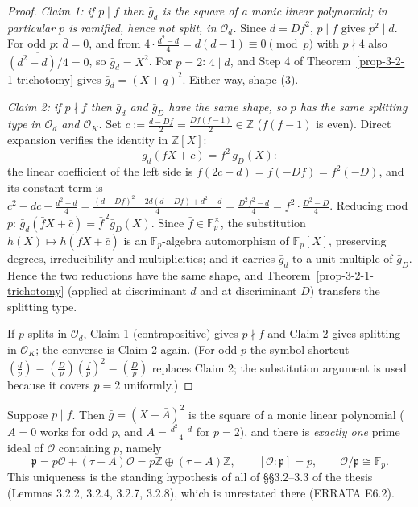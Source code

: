 \begin{proof}
  \emph{Claim 1: if $p \mid f$ then $\bar g_d$ is the square of a monic
  linear polynomial; in particular $p$ is ramified, hence not split, in
  $\mathcal{O}_d$.} Since $d = Df^2$, $p \mid f$ gives $p^2 \mid d$. For odd
  $p$: $\bar d = 0$, and from $4 \cdot \tfrac{d^2-d}{4} = d(d-1) \equiv 0
  \pmod p$ with $p \nmid 4$ also $\overline{(d^2 - d)/4} = 0$, so
  $\bar g_d = X^2$. For $p = 2$: $4 \mid d$, and Step 4 of
  Theorem~\ref{prop-3-2-1-trichotomy} gives $\bar g_d = (X + \bar q)^2$.
  Either way, shape (3).

  \emph{Claim 2: if $p \nmid f$ then $\bar g_d$ and $\bar g_D$ have the same
  shape, so $p$ has the same splitting type in $\mathcal{O}_d$ and
  $\mathcal{O}_K$.} Set $c := \tfrac{d - Df}{2} = \tfrac{Df(f-1)}{2} \in
  \mathbb{Z}$ ($f(f-1)$ is even). Direct expansion verifies the identity in
  $\mathbb{Z}[X]$:
  \[
    g_d(fX + c) = f^2\, g_D(X):
  \]
  the linear coefficient of the left side is $f(2c - d) = f(-Df) = f^2(-D)$,
  and its constant term is
  $c^2 - dc + \tfrac{d^2-d}{4}
    = \tfrac{(d - Df)^2 - 2d(d - Df) + d^2 - d}{4}
    = \tfrac{D^2 f^2 - d}{4}
    = f^2 \cdot \tfrac{D^2 - D}{4}$.
  Reducing mod $p$: $\bar g_d(\bar f X + \bar c) = \bar f^{\,2}\bar g_D(X)$.
  Since $\bar f \in \mathbb{F}_p^\times$, the substitution $h(X) \mapsto
  h(\bar f X + \bar c)$ is an $\mathbb{F}_p$-algebra automorphism of
  $\mathbb{F}_p[X]$, preserving degrees, irreducibility and multiplicities;
  and it carries $\bar g_d$ to a unit multiple of $\bar g_D$. Hence the two
  reductions have the same shape, and Theorem~\ref{prop-3-2-1-trichotomy}
  (applied at discriminant $d$ and at discriminant $D$) transfers the
  splitting type.

  If $p$ splits in $\mathcal{O}_d$, Claim 1 (contrapositive) gives
  $p \nmid f$ and Claim 2 gives splitting in $\mathcal{O}_K$; the converse
  is Claim 2 again. (For odd $p$ the symbol shortcut
  $\left(\frac dp\right) = \left(\frac Dp\right)\left(\frac fp\right)^2 =
  \left(\frac Dp\right)$ replaces Claim 2; the substitution argument is used
  because it covers $p = 2$ uniformly.)
\end{proof}

\begin{proposition}
  \label{prop-3-2-1-unique-prime}
  \leanok
  Suppose $p \mid f$. Then $\bar g = (X - \bar A)^2$ is the square of a
  monic linear polynomial ($A = 0$ works for odd $p$, and $A =
  \tfrac{d^2 - d}{4}$ for $p = 2$), and there is \emph{exactly one} prime
  ideal of $\mathcal{O}$ containing $p$, namely
  \[
    \mathfrak{p} = p\mathcal{O} + (\tau - A)\mathcal{O}
    = p\mathbb{Z} \oplus (\tau - A)\mathbb{Z},
    \qquad [\mathcal{O} : \mathfrak{p}] = p,
    \qquad \mathcal{O}/\mathfrak{p} \cong \mathbb{F}_p.
  \]
  This uniqueness is the standing hypothesis of all of \S\S3.2--3.3 of the
  thesis (Lemmas 3.2.2, 3.2.4, 3.2.7, 3.2.8), which is unrestated there
  (ERRATA E6.2).
\end{proposition}

